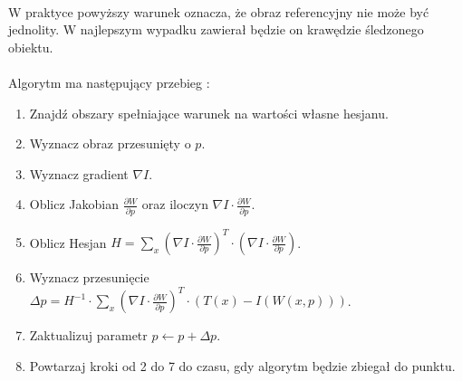 \paragraph*{}
W praktyce powyższy warunek oznacza, że obraz referencyjny nie może być jednolity. W najlepszym wypadku zawierał będzie on krawędzie śledzonego obiektu.
\paragraph*{}
Algorytm ma następujący przebieg \cite{KK}:
\begin{enumerate}
\item Znajdź obszary spełniające warunek na wartości własne hesjanu.
\item Wyznacz obraz przesunięty o \(p\).
\item Wyznacz gradient \(\nabla I\).
\item Oblicz Jakobian \(\frac{\partial W}{\partial p}\) oraz iloczyn \(\nabla I \cdot \frac{\partial W}{\partial p}\).
\item Oblicz Hesjan \(H=\sum\limits_x (\nabla I \cdot \frac{\partial W}{\partial p})^T \cdot (\nabla I \cdot \frac{\partial W}{\partial p})\).
\item Wyznacz przesunięcie \(\Delta p=H^{-1} \cdot \sum\limits_x (\nabla I \cdot \frac{\partial W}{\partial p})^T \cdot (T(x)-I(W(x,p)))\).
\item Zaktualizuj parametr \(p \leftarrow p+\Delta p\).
\item Powtarzaj kroki od 2 do 7 do czasu, gdy algorytm będzie zbiegał do punktu.
\end{enumerate}